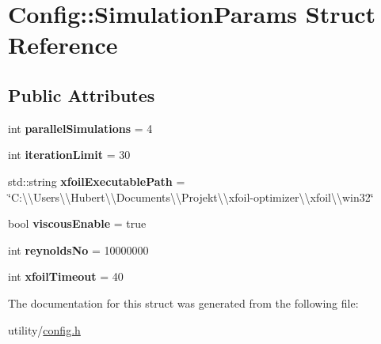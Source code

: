\hypertarget{struct_config_1_1_simulation_params}{}\section{Config\+:\+:Simulation\+Params Struct Reference}
\label{struct_config_1_1_simulation_params}
\subsection*{Public Attributes}
\begin{DoxyCompactItemize}
\item 
\hypertarget{struct_config_1_1_simulation_params_add5098bd19f9fa244339ea37d9a01899}{}\label{struct_config_1_1_simulation_params_add5098bd19f9fa244339ea37d9a01899} 
int {\bfseries parallel\+Simulations} = 4
\item 
\hypertarget{struct_config_1_1_simulation_params_a617db5f91592e59d7e08362078fc68e8}{}\label{struct_config_1_1_simulation_params_a617db5f91592e59d7e08362078fc68e8} 
int {\bfseries iteration\+Limit} = 30
\item 
\hypertarget{struct_config_1_1_simulation_params_af3d6c0f86f6c34cff3b9cedbca5eac2a}{}\label{struct_config_1_1_simulation_params_af3d6c0f86f6c34cff3b9cedbca5eac2a} 
std\+::string {\bfseries xfoil\+Executable\+Path} = \char`\"{}C\+:\textbackslash{}\textbackslash{}\+Users\textbackslash{}\textbackslash{}\+Hubert\textbackslash{}\textbackslash{}\+Documents\textbackslash{}\textbackslash{}\+Projekt\textbackslash{}\textbackslash{}xfoil-\/optimizer\textbackslash{}\textbackslash{}xfoil\textbackslash{}\textbackslash{}win32\char`\"{}
\item 
\hypertarget{struct_config_1_1_simulation_params_a15e8a8fdd1882a8d346aa427ffb84053}{}\label{struct_config_1_1_simulation_params_a15e8a8fdd1882a8d346aa427ffb84053} 
bool {\bfseries viscous\+Enable} = true
\item 
\hypertarget{struct_config_1_1_simulation_params_a9f42dfb281e0b01210ac5643f4d81a30}{}\label{struct_config_1_1_simulation_params_a9f42dfb281e0b01210ac5643f4d81a30} 
int {\bfseries reynolds\+No} = 10000000
\item 
\hypertarget{struct_config_1_1_simulation_params_afec17448be290e3aadba3354150ab580}{}\label{struct_config_1_1_simulation_params_afec17448be290e3aadba3354150ab580} 
int {\bfseries xfoil\+Timeout} = 40
\end{DoxyCompactItemize}


The documentation for this struct was generated from the following file\+:\begin{DoxyCompactItemize}
\item 
utility/\hyperlink{config_8h}{config.\+h}\end{DoxyCompactItemize}
